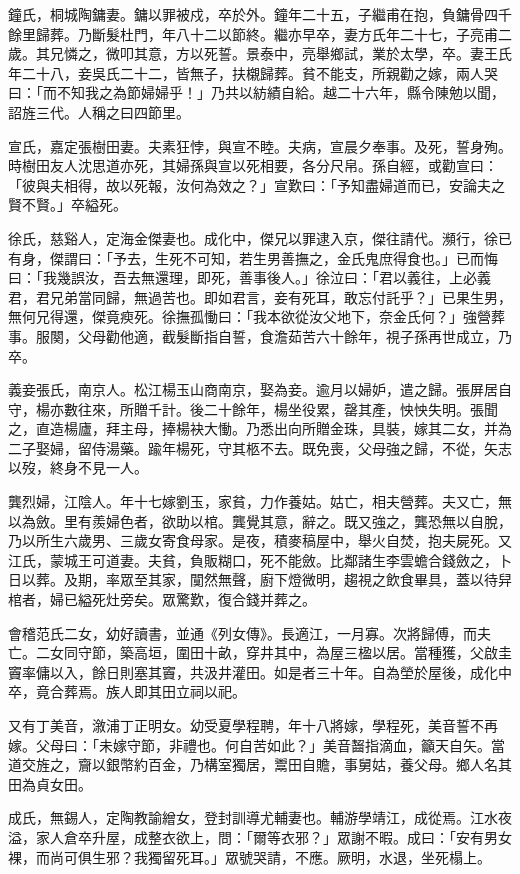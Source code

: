 \begin{pinyinscope}
鐘氏，桐城陶鏞妻。鏞以罪被戍，卒於外。鐘年二十五，子繼甫在抱，負鏞骨四千餘里歸葬。乃斷髮杜門，年八十二以節終。繼亦早卒，妻方氏年二十七，子亮甫二歲。其兄憐之，微叩其意，方以死誓。景泰中，亮舉鄉試，業於太學，卒。妻王氏年二十八，妾吳氏二十二，皆無子，扶櫬歸葬。貧不能支，所親勸之嫁，兩人哭曰：「而不知我之為節婦婦乎！」乃共以紡績自給。越二十六年，縣令陳勉以聞，詔旌三代。人稱之曰四節里。

宣氏，嘉定張樹田妻。夫素狂悖，與宣不睦。夫病，宣晨夕奉事。及死，誓身殉。時樹田友人沈思道亦死，其婦孫與宣以死相要，各分尺帛。孫自經，或勸宣曰：「彼與夫相得，故以死報，汝何為效之？」宣歎曰：「予知盡婦道而已，安論夫之賢不賢。」卒縊死。

徐氏，慈谿人，定海金傑妻也。成化中，傑兄以罪逮入京，傑往請代。瀕行，徐已有身，傑謂曰：「予去，生死不可知，若生男善撫之，金氏鬼庶得食也。」已而悔曰：「我幾誤汝，吾去無還理，即死，善事後人。」徐泣曰：「君以義往，上必義君，君兄弟當同歸，無過苦也。即如君言，妾有死耳，敢忘付託乎？」已果生男，無何兄得還，傑竟瘐死。徐撫孤慟曰：「我本欲從汝父地下，奈金氏何？」強營葬事。服闋，父母勸他適，截髮斷指自誓，食澹茹苦六十餘年，視子孫再世成立，乃卒。

義妾張氏，南京人。松江楊玉山商南京，娶為妾。逾月以婦妒，遣之歸。張屏居自守，楊亦數往來，所贈千計。後二十餘年，楊坐役累，罄其產，怏怏失明。張聞之，直造楊廬，拜主母，捧楊袂大慟。乃悉出向所贈金珠，具裝，嫁其二女，并為二子娶婦，留侍湯藥。踰年楊死，守其柩不去。既免喪，父母強之歸，不從，矢志以歿，終身不見一人。

龔烈婦，江陰人。年十七嫁劉玉，家貧，力作養姑。姑亡，相夫營葬。夫又亡，無以為斂。里有羨婦色者，欲助以棺。龔覺其意，辭之。既又強之，龔恐無以自脫，乃以所生六歲男、三歲女寄食母家。是夜，積麥稿屋中，舉火自焚，抱夫屍死。又江氏，蒙城王可道妻。夫貧，負販糊口，死不能斂。比鄰諸生李雲蟾合錢斂之，卜日以葬。及期，率眾至其家，闃然無聲，廚下燈微明，趨視之飲食畢具，蓋以待舁棺者，婦已縊死灶旁矣。眾驚歎，復合錢并葬之。

會稽范氏二女，幼好讀書，並通《列女傳》。長適江，一月寡。次將歸傅，而夫亡。二女同守節，築高垣，圍田十畝，穿井其中，為屋三楹以居。當種獲，父啟圭竇率傭以入，餘日則塞其竇，共汲井灌田。如是者三十年。自為塋於屋後，成化中卒，竟合葬焉。族人即其田立祠以祀。

又有丁美音，漵浦丁正明女。幼受夏學程聘，年十八將嫁，學程死，美音誓不再嫁。父母曰：「未嫁守節，非禮也。何自苦如此？」美音齧指滴血，籲天自矢。當道交旌之，齎以銀幣約百金，乃構室獨居，鬻田自贍，事舅姑，養父母。鄉人名其田為貞女田。

成氏，無錫人，定陶教諭繒女，登封訓導尤輔妻也。輔游學靖江，成從焉。江水夜溢，家人倉卒升屋，成整衣欲上，問：「爾等衣邪？」眾謝不暇。成曰：「安有男女裸，而尚可俱生邪？我獨留死耳。」眾號哭請，不應。厥明，水退，坐死榻上。


\end{pinyinscope}
